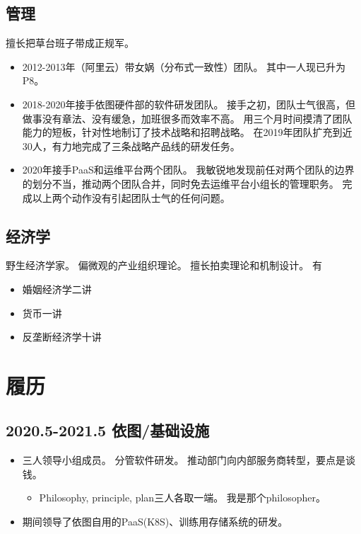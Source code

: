\documentclass[scheme=plain]{ctexart}
\begin{document}
\subsection{管理}

擅长把草台班子带成正规军。
\begin{itemize}
    \item 2012-2013年（阿里云）带女娲（分布式一致性）团队。
        其中一人现已升为P8。
    \item 2018-2020年接手依图硬件部的软件研发团队。
        接手之初，团队士气很高，但做事没有章法、没有缓急，加班很多而效率不高。
        用三个月时间摸清了团队能力的短板，针对性地制订了技术战略和招聘战略。
        在2019年团队扩充到近30人，有力地完成了三条战略产品线的研发任务。
    \item 2020年接手PaaS和运维平台两个团队。
        我敏锐地发现前任对两个团队的边界的划分不当，推动两个团队合并，同时免去运维平台小组长的管理职务。
        完成以上两个动作没有引起团队士气的任何问题。
\end{itemize}

\subsection{经济学}

野生经济学家。
偏微观的产业组织理论。
擅长拍卖理论和机制设计。
有
\begin{itemize}
    \item 婚姻经济学二讲
    \item 货币一讲
    \item 反垄断经济学十讲
\end{itemize}

\section{履历}

\subsection*{2020.5-2021.5 依图/基础设施}

\begin{itemize}
    \item 三人领导小组成员。
        分管软件研发。
        推动部门向内部服务商转型，要点是谈钱。
        \begin{itemize}
            \item Philosophy, principle, plan三人各取一端。
                我是那个philosopher。
        \end{itemize}
    \item 期间领导了依图自用的PaaS(K8S)、训练用存储系统的研发。
\end{itemize}
\end{document}
